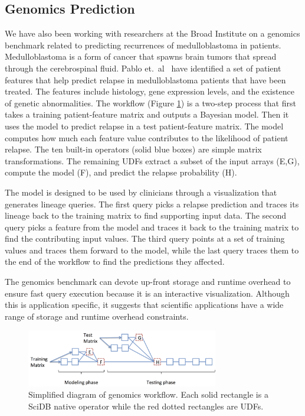 \subsection{Genomics Prediction} \label{s:ucgenomics}


We have also been working with researchers at the Broad Institute on a genomics
benchmark related to predicting recurrences of medulloblastoma in patients.
Medulloblastoma is a form of cancer that spawns brain tumors that spread
through the cerebrospinal fluid.  Pablo et.~al~\cite{pablo} have identified a
set of patient features that help predict relapse in medulloblastoma patients
that have been treated.  The features include histology, gene expression levels,  and the existence of genetic abnormalities.  The
workflow (Figure \ref{f:genomicsworkflow}) is a two-step process that first
takes a training patient-feature matrix and outputs a Bayesian model.  Then it
uses the model to predict relapse in a test patient-feature matrix.  The model
computes how much each feature value contributes to the likelihood of patient
relapse.  The ten built-in operators (solid blue boxes) are simple matrix
transformations.  The remaining UDFs extract a subset of the input arrays
(E,G), compute the model (F), and predict the relapse probability (H).

The model is designed to be used by clinicians through a visualization that
generates lineage queries.  The first query picks a relapse prediction and traces its
lineage back to the training matrix to find supporting input data. The second
query picks a feature  from the model and traces it back to the training
matrix to find the contributing input values.  The third query points at a set
of training values and traces them forward to the model, while the last query
traces them to the end of the workflow to find the predictions they affected.

The genomics benchmark can devote up-front storage and runtime overhead to
ensure fast  query execution because it is an interactive visualization.
Although this is application specific, it suggests that scientific applications
have a wide range of storage and runtime overhead constraints.



\begin{figure}[h] \centerline{\includegraphics[width=3.3in,natwidth=9.06in,natheight=2.7in]{figures/genomics.png}}
\caption{Simplified diagram of genomics workflow.  Each solid rectangle is a
SciDB native operator while the red dotted rectangles are UDFs.}
\label{f:genomicsworkflow} \end{figure}



